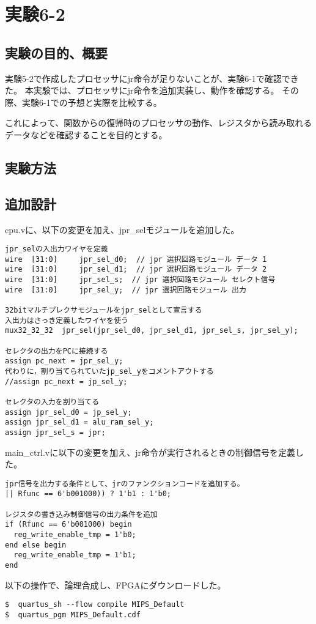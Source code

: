 \section{実験6-2}
\subsection{実験の目的、概要}
実験5-2で作成したプロセッサにjr命令が足りないことが、実験6-1で確認できた。
本実験では、プロセッサにjr命令を追加実装し、動作を確認する。
その際、実験6-1での予想と実際を比較する。

これによって、関数からの復帰時のプロセッサの動作、レジスタから読み取れるデータなどを確認することを目的とする。

\subsection{実験方法}

\subsection{追加設計}
cpu.vに、以下の変更を加え、jpr\_selモジュールを追加した。
\begin{lstlisting}[caption={cpu.vの追加設計},label={cpu.vの追加設計6-2}]
jpr_selの入出力ワイヤを定義
wire  [31:0]     jpr_sel_d0;  // jpr 選択回路モジュール データ 1
wire  [31:0]     jpr_sel_d1;  // jpr 選択回路モジュール データ 2
wire  [31:0]     jpr_sel_s;  // jpr 選択回路モジュール セレクト信号
wire  [31:0]     jpr_sel_y;  // jpr 選択回路モジュール 出力

32bitマルチプレクサモジュールをjpr_selとして宣言する
入出力はさっき定義したワイヤを使う
mux32_32_32  jpr_sel(jpr_sel_d0, jpr_sel_d1, jpr_sel_s, jpr_sel_y);

セレクタの出力をPCに接続する
assign pc_next = jpr_sel_y;
代わりに，割り当てられていたjp_sel_yをコメントアウトする
//assign pc_next = jp_sel_y;

セレクタの入力を割り当てる
assign jpr_sel_d0 = jp_sel_y;
assign jpr_sel_d1 = alu_ram_sel_y;
assign jpr_sel_s = jpr;
\end{lstlisting}

main\_ctrl.vに以下の変更を加え、jr命令が実行されるときの制御信号を定義した。
\begin{lstlisting}[caption={main\_ctrl.vの追加設計},label={mainctrl.vの追加設計6-2}]
jpr信号を出力する条件として、jrのファンクションコードを追加する。
|| Rfunc == 6'b001000)) ? 1'b1 : 1'b0;

レジスタの書き込み制御信号の出力条件を追加
if (Rfunc == 6'b001000) begin
  reg_write_enable_tmp = 1'b0;
end else begin
  reg_write_enable_tmp = 1'b1;
end
\end{lstlisting}
以下の操作で、論理合成し、FPGAにダウンロードした。
\begin{lstlisting}[caption={論理合成、ダウンロード},label={論理合成、ダウンロード6-2}]
$  quartus_sh --flow compile MIPS_Default
$  quartus_pgm MIPS_Default.cdf
\end{lstlisting}

